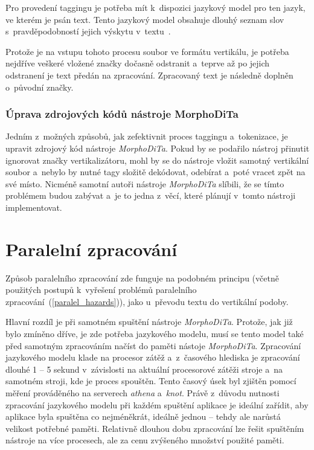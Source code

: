 Pro provedení taggingu je potřeba mít k~dispozici jazykový model pro ten jazyk, ve kterém je psán text. Tento jazykový model obsahuje
dlouhý seznam slov s~pravděpodobností jejich výskytu v~textu~\cite{LANGMODEL}.

Protože je na vstupu tohoto procesu soubor ve formátu vertikálu, je potřeba nejdříve veškeré vložené značky dočasně odstranit a~teprve
až po jejich odstranení je text předán na zpracování. Zpracovaný text je následně doplněn o~původní značky.

\subsubsection{Úprava zdrojových kódů nástroje MorphoDiTa}
Jedním z~možných způsobů, jak zefektivnit proces taggingu a~tokenizace, je upravit zdrojový kód
nástroje \textit{MorphoDiTa}. Pokud by se podařilo nástroj přinutit ignorovat značky vertikalizátoru,
mohl by se do nástroje vložit samotný vertikální soubor a~nebylo by nutné tagy složitě dekódovat,
odebírat a~poté vracet zpět na své místo. Nicméně samotní autoři nástroje \textit{MorphoDiTa} slíbili,
že se tímto problémem budou zabývat a~je to jedna z~věcí, které plánují v~tomto nástroji
implementovat.

\section{Paralelní zpracování}
Způsob paralelního zpracování zde funguje na podobném principu (včetně použitých postupů k~vyřešení problémů
paralelního zpracování~(\ref{paralel_hazards})), jako u~převodu textu do vertikální podoby.

Hlavní rozdíl je při samotném spuštění nástroje \textit{MorphoDiTa}. Protože, jak již bylo zmíněno dříve, je zde potřeba
jazykového modelu, musí se tento model také před samotným zpracováním načíst do paměti nástoje \textit{MorphoDiTa}.
Zpracování jazykového modelu klade na procesor zátěž a~z~časového hlediska je zpracování dlouhé 1 -- 5 sekund v~závislosti
na aktuální procesorové zátěži stroje a~na samotném stroji, kde je proces spouštěn. Tento časový úsek
byl zjištěn pomocí měření prováděného na serverech \textit{athena} a~\textit{knot}. Právě z~důvodu nutnosti
zpracování jazykového modelu při každém spuštění aplikace je ideální zařídit, aby aplikace
byla spuštěna co nejméněkrát, ideálně jednou -- tehdy ale narůstá velikost potřebné paměti. Relativně dlouhou dobu zpracování
lze řešit spuštěním nástroje na více procesech, ale za cenu zvýšeného množství použité paměti.

